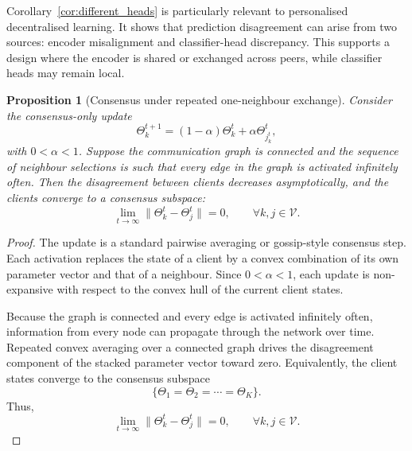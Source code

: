 \documentclass[conference]{IEEEtran}
\newtheorem{proposition}{Proposition}
\begin{document}
Corollary~\ref{cor:different_heads} is particularly relevant to personalised decentralised learning. It shows that prediction disagreement can arise from two sources: encoder misalignment and classifier-head discrepancy. This supports a design where the encoder is shared or exchanged across peers, while classifier heads may remain local.

\begin{proposition}[Consensus under repeated one-neighbour exchange]
\label{prop:consensus}
Consider the consensus-only update
\begin{equation}
\Theta_k^{t+1}
=
(1-\alpha)\Theta_k^t
+
\alpha\Theta_{j_k^t}^t,
    \label{eq:auto-090}
\end{equation}
with $0<\alpha<1$. Suppose the communication graph is connected and the sequence of neighbour selections is such that every edge in the graph is activated infinitely often. Then the disagreement between clients decreases asymptotically, and the clients converge to a consensus subspace:
\begin{equation}
\lim_{t\rightarrow\infty}
\|\Theta_k^t-\Theta_j^t\|
=
0,
\qquad
\forall k,j\in\mathcal{V}.
    \label{eq:auto-091}
\end{equation}
\end{proposition}

\begin{proof}
The update is a standard pairwise averaging or gossip-style consensus step. Each activation replaces the state of a client by a convex combination of its own parameter vector and that of a neighbour. Since $0<\alpha<1$, each update is non-expansive with respect to the convex hull of the current client states.

Because the graph is connected and every edge is activated infinitely often, information from every node can propagate through the network over time. Repeated convex averaging over a connected graph drives the disagreement component of the stacked parameter vector toward zero. Equivalently, the client states converge to the consensus subspace
\begin{equation}
\{\Theta_1=\Theta_2=\cdots=\Theta_K\}.
    \label{eq:auto-092}
\end{equation}
Thus,
\begin{equation}
\lim_{t\rightarrow\infty}
\|\Theta_k^t-\Theta_j^t\|
=
0,
\qquad
\forall k,j\in\mathcal{V}.
    \label{eq:auto-093}
\end{equation}
\end{proof}
\end{document}
